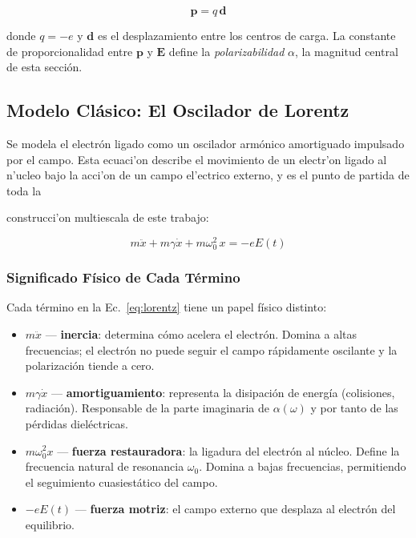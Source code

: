 \documentclass[12pt]{article}
\begin{document}
\begin{equation}
\mathbf{p} = q\,\mathbf{d}
\end{equation}

donde $q = -e$ y $\mathbf{d}$ es el desplazamiento entre los centros de carga. La constante de
proporcionalidad entre $\mathbf{p}$ y $\mathbf{E}$ define la \emph{polarizabilidad}
$\alpha$, la magnitud central de esta secci\'on.

\subsection{Modelo Cl\'asico: El Oscilador de Lorentz}

Se modela el electr\'on ligado como un oscilador arm\'onico amortiguado impulsado por el
campo. Esta ecuaci'on describe el movimiento de un electr'on ligado al n'ucleo bajo
la acci'on de un campo el'ectrico externo, y es el punto de partida de toda la

construcci'on multiescala de este trabajo:

\begin{equation}
m\ddot{x} + m\gamma\dot{x} + m\omega_0^2\,x = -eE(t)
\label{eq:lorentz}
\end{equation}

\subsubsection{Significado F\'isico de Cada T\'ermino}

Cada t\'ermino en la Ec.~\eqref{eq:lorentz} tiene un papel f\'isico distinto:

\begin{itemize}
\item $m\ddot{x}$ --- \textbf{inercia}: determina c\'omo acelera el electr\'on. Domina a
altas frecuencias; el electr\'on no puede seguir el campo r\'apidamente oscilante
y la polarizaci\'on tiende a cero.
\item $m\gamma\dot{x}$ --- \textbf{amortiguamiento}: representa la disipaci\'on de energ\'ia
(colisiones, radiaci\'on). Responsable de la parte imaginaria de $\alpha(\omega)$
y por tanto de las p\'erdidas diel\'ectricas.
\item $m\omega_0^2 x$ --- \textbf{fuerza restauradora}: la ligadura del electr\'on al
n\'ucleo. Define la frecuencia natural de resonancia $\omega_0$. Domina a bajas
frecuencias, permitiendo el seguimiento cuasiestático del campo.
\item $-eE(t)$ --- \textbf{fuerza motriz}: el campo externo que desplaza al electr\'on
del equilibrio.
\end{itemize}
\end{document}
